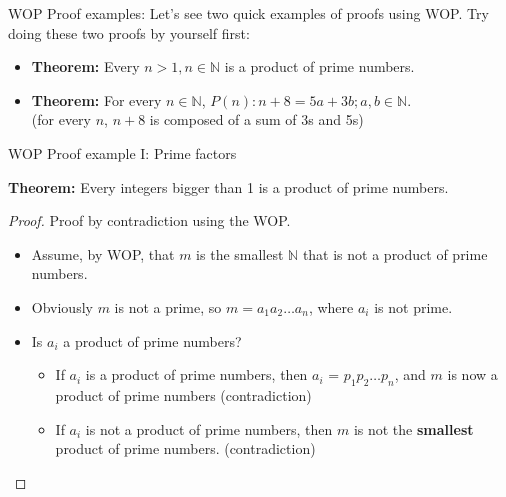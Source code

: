 \begin{frame}{WOP Proof examples:}
  Let's see two quick examples of proofs using WOP. Try doing these two proofs by yourself first:
  \vfill

  \begin{itemize}
    \item {\bf Theorem:} Every $n > 1, n\in\mathbb{N}$ is a product of prime numbers.\bigskip

    \item {\bf Theorem:} For every $n\in\mathbb{N}$, $P(n): n+8 = 5a+3b; a,b \in\mathbb{N}$.\\(for every $n$, $n+8$ is composed of a sum of 3s and 5s)
  \end{itemize}
\end{frame}

\begin{frame}{WOP Proof example I: Prime factors}

  {\bf Theorem:} Every integers bigger than 1 is a product of prime numbers.
  \begin{proof}
    Proof by contradiction using the WOP.
    \begin{itemize}
      \item Assume, by WOP, that $m$ is the smallest $\mathbb{N}$ that is not a product of prime numbers.
      \item Obviously $m$ is not a prime, so $m = a_1a_2\ldots a_n$, where $a_i$ is not prime.
      \item Is $a_i$ a product of prime numbers?
      \begin{itemize}
        \item If $a_i$ is a product of prime numbers, then $a_i$ = $p_1p_2\ldots p_n$, and $m$ is now a product of prime numbers (\alert{contradiction})
        \item If $a_i$ is not a product of prime numbers, then $m$ is not the {\bf smallest} product of prime numbers. (\alert{contradiction})
      \end{itemize}
    \end{itemize}
  \end{proof}
\end{frame}

